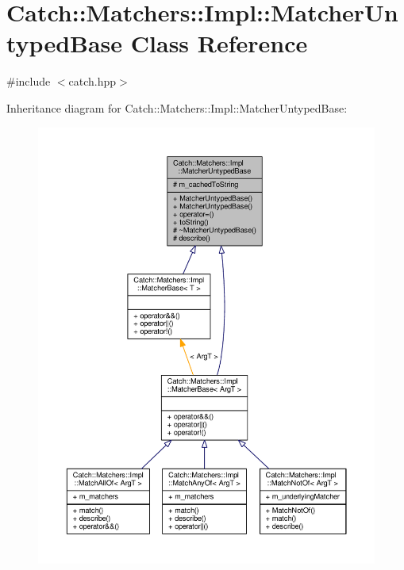 \hypertarget{class_catch_1_1_matchers_1_1_impl_1_1_matcher_untyped_base}{\section{Catch\-:\-:Matchers\-:\-:Impl\-:\-:Matcher\-Untyped\-Base Class Reference}
\label{class_catch_1_1_matchers_1_1_impl_1_1_matcher_untyped_base}
}


{\ttfamily \#include $<$catch.\-hpp$>$}



Inheritance diagram for Catch\-:\-:Matchers\-:\-:Impl\-:\-:Matcher\-Untyped\-Base\-:
\nopagebreak
\begin{figure}[H]
\begin{center}
\leavevmode
\includegraphics[width=350pt]{class_catch_1_1_matchers_1_1_impl_1_1_matcher_untyped_base__inherit__graph}
\end{center}
\end{figure}



